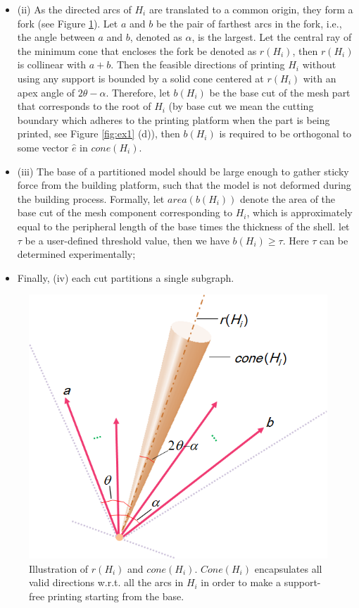 \begin{itemize}
\item (ii) As the directed arcs of $H_i$ are translated to a common origin, they form a fork (see Figure \ref{fig:cone}). Let $a$ and $b$ be the pair of farthest arcs in the fork, i.e., the angle between $a$ and $b$, denoted as $\alpha$, is the largest. Let the central ray of the minimum cone that encloses the fork be denoted as $r(H_i)$, then $r(H_i)$ is collinear with $a + b$. Then the feasible directions of printing $H_i$ without using any support is bounded by a solid cone centered at $r(H_i)$ with an apex angle of $2\theta-\alpha$. Therefore, let $b(H_i)$ be the base cut of the mesh part that corresponds to the root of $H_i$ (by base cut we mean the cutting boundary which adheres to the printing platform when the part is being printed, see Figure \ref{fig:ex1} (d)), then $b(H_i)$ is required to be orthogonal to some vector $\hat{e}$ in $cone(H_i)$.
\item (iii) The base of a partitioned model should be large enough to gather sticky force from the building platform, such that the model is not deformed during the building process. Formally, let $area(b(H_i))$ denote the area of the base cut of the mesh component corresponding to $H_i$, which is approximately equal to the peripheral length of the base times the thickness of the shell. let $\tau$ be a user-defined threshold value, then we have $b(H_i) \geq \tau$. Here $\tau$ can be determined experimentally;

\item Finally, (iv) each cut partitions a single subgraph.

\end{itemize}

\begin{figure}[t]
  \centering
  \includegraphics[width=0.6\linewidth]{figs/cone.png}
  \caption{\label{fig:cone}%
           Illustration of $r(H_i)$ and $cone(H_i)$. $Cone(H_i)$ encapsulates all valid directions w.r.t. all the arcs in $H_i$ in order to make a support-free printing starting from the base.}
\end{figure}


